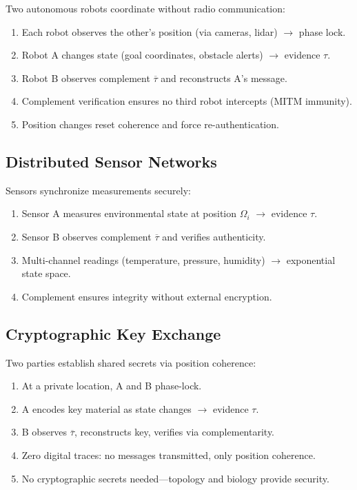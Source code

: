 \documentclass[twocolumn,10pt,a4paper]{article}
\theoremstyle{plain}
\theoremstyle{definition}
\newcommand{\comp}[1]{\overline{#1}}
\begin{document}
Two autonomous robots coordinate without radio communication:
\begin{enumerate}
\item Each robot observes the other's position (via cameras, lidar) $\rightarrow$ phase lock.
\item Robot A changes state (goal coordinates, obstacle alerts) $\rightarrow$ evidence $\tau$.
\item Robot B observes complement $\comp{\tau}$ and reconstructs A's message.
\item Complement verification ensures no third robot intercepts (MITM immunity).
\item Position changes reset coherence and force re-authentication.
\end{enumerate}

\subsection{Distributed Sensor Networks}

Sensors synchronize measurements securely:
\begin{enumerate}
\item Sensor A measures environmental state at position $\Omega_i$ $\rightarrow$ evidence $\tau$.
\item Sensor B observes complement $\comp{\tau}$ and verifies authenticity.
\item Multi-channel readings (temperature, pressure, humidity) $\rightarrow$ exponential state space.
\item Complement ensures integrity without external encryption.
\end{enumerate}

\subsection{Cryptographic Key Exchange}

Two parties establish shared secrets via position coherence:
\begin{enumerate}
\item At a private location, A and B phase-lock.
\item A encodes key material as state changes $\rightarrow$ evidence $\tau$.
\item B observes $\comp{\tau}$, reconstructs key, verifies via complementarity.
\item Zero digital traces: no messages transmitted, only position coherence.
\item No cryptographic secrets needed---topology and biology provide security.
\end{enumerate}
\end{document}
